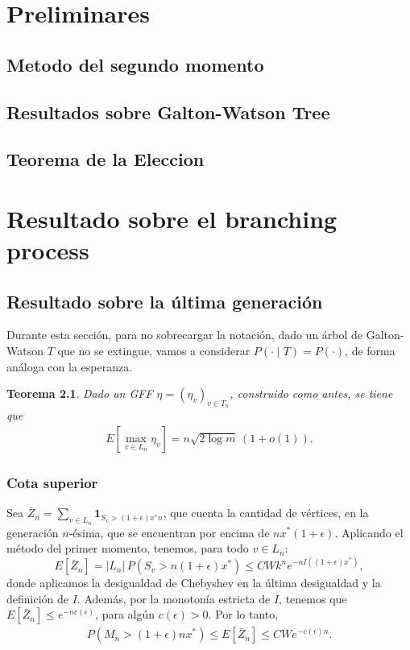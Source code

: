 \documentclass[12pt]{report}
\newtheorem{theorem}{Teorema}  %
\begin{document}
\tableofcontents
\newpage

\chapter{Preliminares}
\section{Metodo del segundo momento}
\section{Resultados sobre Galton-Watson Tree}
\section{Teorema de la Eleccion}

\chapter{Resultado sobre el branching process}
\section{Resultado sobre la última generación}

Durante esta sección, para no sobrecargar la notación, dado un árbol de Galton-Watson $T$ que no se extingue, 
vamos a considerar $P(\cdot \mid T) = P(\cdot)$, de forma análoga con la esperanza.

\begin{theorem}
Dado un GFF $\eta = (\eta_{v})_{v \in T_{n}}$, construido como antes, se tiene que
\begin{align} 
E\left[\max_{v \in L_n} \eta_v\right] = n\sqrt{2\log m} \, (1 + o(1)).
\end{align}
\end{theorem}

\subsection{Cota superior}

Sea $\bar{Z}_n = \sum_{v \in L_n} \mathbf{1}_{S_v > (1 + \epsilon)x^* n}$, 
que cuenta la cantidad de vértices, en la generación $n$-ésima, 
que se encuentran por encima de $n x^*(1 + \epsilon)$. Aplicando el método del primer momento, 
tenemos, para todo $v \in L_n$:
\[
E[\bar{Z}_n] = |L_n| \, P(S_v > n(1 + \epsilon)x^*) \leq CW k^n e^{-n I((1 + \epsilon)x^*)},
\]
donde aplicamos la desigualdad de Chebyshev en la última desigualdad y la definición de $I$. Además, por 
la monotonía estricta de $I$, tenemos que $E[\bar{Z}_n] \leq e^{-n c(\epsilon)}$, 
para algún $c(\epsilon) > 0$. Por lo tanto,
\begin{align}
P(M_n > (1 + \epsilon) n x^*) \leq E[\bar{Z}_n] \leq CWe^{-c(\epsilon)n}.
\end{align}
\end{document}
